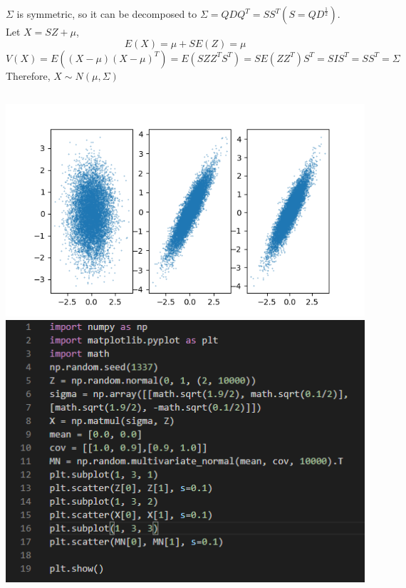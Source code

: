 \documentclass{article}
\begin{document}
\subsection {}

$\Sigma$ is symmetric, so it can be decomposed to $\Sigma = QDQ^T = SS^T (S = QD^{\frac{1}{2}})$.\\
Let $X = SZ + \mu$,
\[E(X) = \mu + SE(Z) = \mu\]
\[V(X) = E((X-\mu)(X-\mu)^T) = E(SZZ^TS^T) = SE(ZZ^T)S^T = SIS^T = SS^T = \Sigma\]
Therefore, $X \sim N(\mu, \Sigma)$
\subsection {}
\begin{center}
\includegraphics{5-2plot.png}
\includegraphics{5-2code.png}
\end{center}
\end{document}
